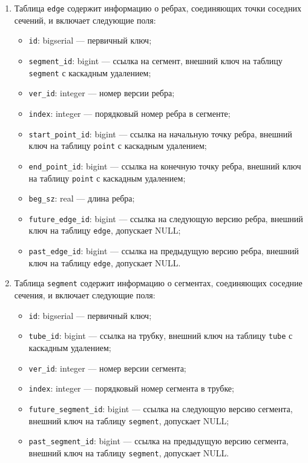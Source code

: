 \begin{enumerate}
    \item Таблица \texttt{edge} содержит информацию о ребрах, соединяющих точки соседних сечений, и включает следующие поля:
        \begin{itemize}[leftmargin=\parindent]
            \item \texttt{id}: bigserial --- первичный ключ;
            \item \texttt{segment\_id}: bigint --- ссылка на сегмент, внешний ключ на таблицу \texttt{segment} с каскадным удалением;
            \item \texttt{ver\_id}: integer --- номер версии ребра;
            \item \texttt{index}: integer --- порядковый номер ребра в сегменте;
            \item \texttt{start\_point\_id}: bigint --- ссылка на начальную точку ребра, внешний ключ на таблицу \texttt{point} с каскадным удалением;
            \item \texttt{end\_point\_id}: bigint --- ссылка на конечную точку ребра, внешний ключ на таблицу \texttt{point} с каскадным удалением;
            \item \texttt{beg\_sz}: real --- длина ребра;
            \item \texttt{future\_edge\_id}: bigint --- ссылка на следующую версию ребра, внешний ключ на таблицу \texttt{edge}, допускает NULL;
            \item \texttt{past\_edge\_id}: bigint --- ссылка на предыдущую версию ребра, внешний ключ на таблицу \texttt{edge}, допускает NULL.
        \end{itemize}

    \item Таблица \texttt{segment} содержит информацию о сегментах, соединяющих соседние сечения, и включает следующие поля:
        \begin{itemize}[leftmargin=\parindent]
            \item \texttt{id}: bigserial --- первичный ключ;
            \item \texttt{tube\_id}: bigint --- ссылка на трубку, внешний ключ на таблицу \texttt{tube} с каскадным удалением;
            \item \texttt{ver\_id}: integer --- номер версии сегмента;
            \item \texttt{index}: integer --- порядковый номер сегмента в трубке;
            \item \texttt{future\_segment\_id}: bigint --- ссылка на следующую версию сегмента, внешний ключ на таблицу \texttt{segment}, допускает NULL;
            \item \texttt{past\_segment\_id}: bigint --- ссылка на предыдущую версию сегмента, внешний ключ на таблицу \texttt{segment}, допускает NULL.
        \end{itemize}


\end{enumerate}
